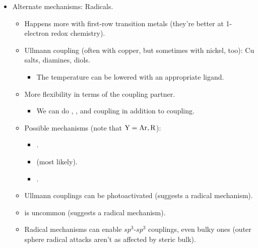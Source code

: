 \documentclass[../notes.tex]{subfiles}
\begin{document}
\begin{itemize}
\begin{itemize}
    \end{itemize}
    \item Alternate mechanisms: Radicals.
    \begin{itemize}
        \item Happens more with first-row transition metals (they're better at 1-electron redox chemistry).
        \item Ullmann coupling (often with copper, but sometimes with nickel, too):  Cu salts, diamines, diols.
        \begin{itemize}
            \item The temperature can be lowered with an appropriate ligand.
        \end{itemize}
        \item More flexibility in terms of the coupling partner.
        \begin{itemize}
            \item We can do , , and  coupling in addition to  coupling.
        \end{itemize}
        \item Possible mechanisms (note that $\ce{Y}=\ce{Ar},\ce{R}$):
        \begin{itemize}
            \item {}.
            \item {} (most likely).
            \item {}.
        \end{itemize}
        \item Ullmann couplings can be photoactivated (suggests a radical mechanism).
        \item {} is uncommon (suggests a radical mechanism).
        \item Radical mechanisms can enable $sp^3$-$sp^3$ couplings, even bulky ones (outer sphere radical attacks aren't as affected by steric bulk).
    \end{itemize}
\end{itemize}
\end{document}

